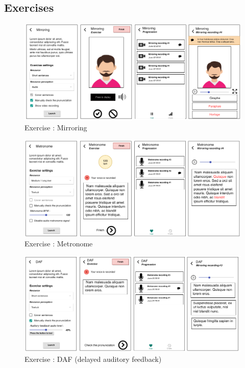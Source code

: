\begin{appendices}
\section{Exercises}
\begin{figure}[H]
  \includegraphics[width=1\linewidth]{content/imgs/maquette2a.png}
  \caption*{Exercise : Mirroring}
\end{figure}

\begin{figure}[H]
  \includegraphics[width=1\linewidth]{content/imgs/maquette2b.png}
  \caption*{Exercise : Metronome}
\end{figure}

\begin{figure}[H]
  \includegraphics[width=1\linewidth]{content/imgs/maquette2c.png}
  \caption*{Exercise : DAF (delayed auditory feedback)}
\end{figure}


\end{appendices}
